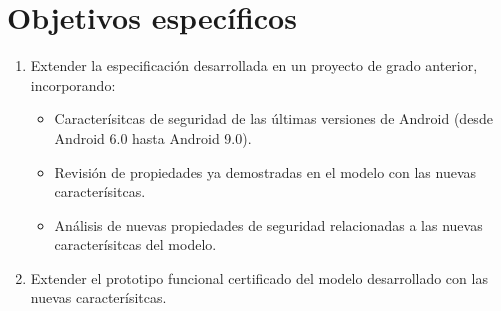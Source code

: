\section{Objetivos específicos}
\begin{enumerate}
    \item Extender la especificación desarrollada en un proyecto de grado
          anterior, incorporando:
          \label{item:especificacion-coq}
          \begin{itemize}
              \item Caracterísitcas de seguridad de las últimas versiones de
                    Android (desde Android 6.0 hasta Android 9.0).
              \item Revisión de propiedades ya demostradas en el modelo con las
                    nuevas caracterísitcas.
              \item Análisis de nuevas propiedades de seguridad relacionadas a
                    las nuevas caracterísitcas del modelo.
          \end{itemize}
    \item Extender el prototipo funcional certificado del modelo desarrollado
          con las nuevas caracterísitcas.
          \label{item:prototipo}
\end{enumerate}
